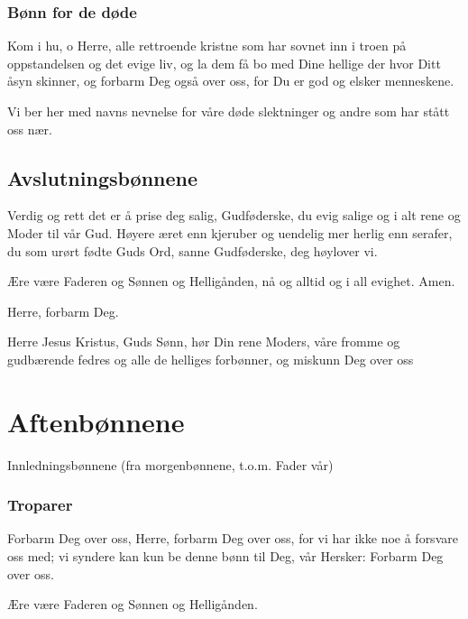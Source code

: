 \subsubsection{Bønn for de døde}

Kom i hu, o Herre, alle rettroende kristne som har sovnet inn i troen på oppstandelsen og det evige liv, og la dem få bo med Dine hellige der hvor Ditt åsyn skinner, og forbarm Deg også over oss, for Du er god og elsker menneskene. 

\begin{forklaring}
Vi ber her med navns nevnelse for våre døde slektninger og andre som har stått oss nær. 
\end{forklaring}

\subsection{Avslutningsbønnene}

Verdig og rett det er å prise deg salig, Gudføderske, du evig salige og i alt rene og Moder til vår Gud. Høyere æret enn kjeruber og uendelig mer herlig enn serafer, du som urørt fødte Guds Ord, sanne Gudføderske, deg høylover vi. 

Ære være Faderen og Sønnen og Helligånden, nå og alltid og i all evighet. Amen. 

Herre, forbarm Deg. 

Herre Jesus Kristus, Guds Sønn, hør Din rene Moders, våre fromme og gudbærende fedres og alle de helliges forbønner, og miskunn Deg over oss 

\section{Aftenbønnene}

\begin{forklaring}
Innledningsbønnene (fra morgenbønnene, t.o.m. Fader vår)
\end{forklaring}

\subsubsection{Troparer}

Forbarm Deg over oss, Herre, forbarm Deg over oss, for vi har ikke noe å forsvare oss med; vi syndere kan kun be denne bønn til Deg, vår Hersker: Forbarm Deg over oss.

Ære være Faderen og Sønnen og Helligånden.

